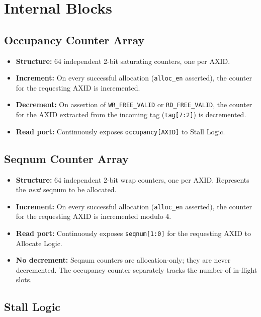 \documentclass[11pt,a4paper]{article}
\begin{document}
\section{Internal Blocks}

\subsection{Occupancy Counter Array}

\begin{itemize}
  \item \textbf{Structure:} 64 independent 2-bit saturating counters,
        one per AXID.
  \item \textbf{Increment:} On every successful allocation
        (\texttt{alloc\_en} asserted), the counter for the requesting
        AXID is incremented.
  \item \textbf{Decrement:} On assertion of \texttt{WR\_FREE\_VALID} or
        \texttt{RD\_FREE\_VALID}, the counter for the AXID extracted from
        the incoming tag (\texttt{tag[7:2]}) is decremented.
  \item \textbf{Read port:} Continuously exposes
        \texttt{occupancy[AXID]} to Stall Logic.
\end{itemize}

\subsection{Seqnum Counter Array}

\begin{itemize}
  \item \textbf{Structure:} 64 independent 2-bit wrap counters, one per
        AXID. Represents the \emph{next} seqnum to be allocated.
  \item \textbf{Increment:} On every successful allocation
        (\texttt{alloc\_en} asserted), the counter for the requesting
        AXID is incremented modulo 4.
  \item \textbf{Read port:} Continuously exposes \texttt{seqnum[1:0]}
        for the requesting AXID to Allocate Logic.
  \item \textbf{No decrement:} Seqnum counters are allocation-only;
        they are never decremented. The occupancy counter separately
        tracks the number of in-flight slots.
\end{itemize}

\subsection{Stall Logic}
\end{document}
